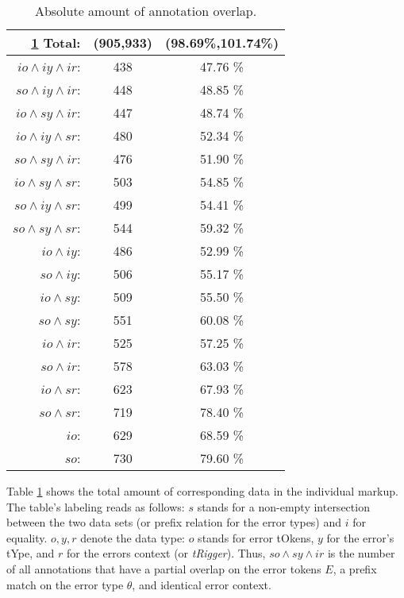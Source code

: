 \documentclass[12pt]{article}
\begin{document}
\begin{table}
  \centering
\begin{tabular}{r|c|c}\ref{tab:1}
  Total: & (905,933)& (98.69\%,101.74\%)\\\hline
  $io \wedge iy \wedge ir$:& 438 & 47.76 \%\\
  $so \wedge iy \wedge ir$:& 448 & 48.85 \%\\
  $io \wedge sy \wedge ir$:& 447 & 48.74 \%\\
  $io \wedge iy \wedge sr$:& 480 & 52.34 \%\\
  $so \wedge sy \wedge ir$:& 476 & 51.90 \%\\
  $io \wedge sy \wedge sr$:& 503 & 54.85 \%\\
  $so \wedge iy \wedge sr$:& 499 & 54.41 \%\\
  $so \wedge sy \wedge sr$:& 544 & 59.32 \%\\
  $     io \wedge iy$:& 486      & 52.99 \%\\
  $     so \wedge iy$:& 506      & 55.17 \%\\
  $     io \wedge sy$:& 509      & 55.50 \%\\
  $     so \wedge sy$:& 551      & 60.08 \%\\
  $     io \wedge ir$:& 525      & 57.25 \%\\
  $     so \wedge ir$:& 578      & 63.03 \%\\
  $     io \wedge sr$:& 623      & 67.93 \%\\
  $     so \wedge sr$:& 719      & 78.40 \%\\
  $          io$:& 629           & 68.59 \%\\
  $          so$:& 730           & 79.60 \%\\
\end{tabular}
\caption{Absolute amount of annotation overlap.}\label{tab:1}

\end{table}

Table \ref{tab:1} shows the total amount of corresponding data in the individual
markup. The table's labeling reads as follows: $s$ stands for a non-empty
intersection between the two data sets (or prefix relation for the error types)
and $i$ for equality.  $o,y,r$ denote the data type: $o$ stands for error
tOkens, $y$ for the error's tYpe, and $r$ for the errors context (or
\textit{tRigger}). Thus, $so\wedge sy\wedge ir$ is the number of all annotations
that have a partial overlap on the error tokens $E$, a prefix match on the error
type $\theta$, and identical error context.
\end{document}
